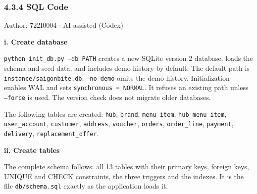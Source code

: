 \subsubsection*{4.3.4 SQL Code}
Author: 722I0004 \ensuremath{\cdot} AI-assisted (Codex)

\textbf{i. Create database}

\texttt{python init\_\allowbreak{}db.\allowbreak{}py --db PATH} creates a new SQLite version 2 database, loads the schema and seed data, and includes demo history by default. The default path is \texttt{instance/\allowbreak{}saigonbite.\allowbreak{}db}; \texttt{--no-demo} omits the demo history. Initialization enables WAL and sets \texttt{synchronous = NORMAL}. It refuses an existing path unless \texttt{--force} is used. The version check does not migrate older databases.

The following tables are created: \texttt{hub}, \texttt{brand}, \texttt{menu\_\allowbreak{}item}, \texttt{hub\_\allowbreak{}menu\_\allowbreak{}item}, \texttt{user\_\allowbreak{}account}, \texttt{customer}, \texttt{address}, \texttt{voucher}, \texttt{orders}, \texttt{order\_\allowbreak{}line}, \texttt{payment}, \texttt{delivery}, \texttt{replacement\_\allowbreak{}offer}.

\textbf{ii. Create tables}

The complete schema follows: all 13 tables with their primary keys, foreign keys, UNIQUE and CHECK constraints, the three triggers and the indexes. It is the file \texttt{db/\allowbreak{}schema.\allowbreak{}sql} exactly as the application loads it.

